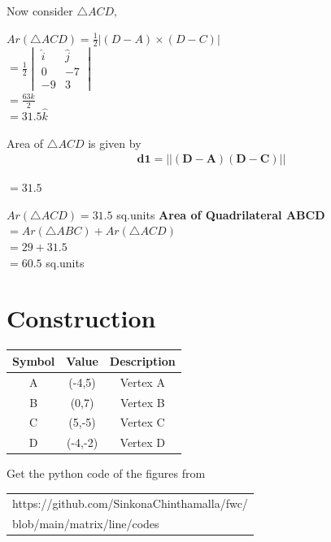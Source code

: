 \documentclass[journal,12pt,twocolumn]{IEEEtran}
\begin{document}
\vspace{0.6cm}
\raggedright 
Now consider $ \triangle ACD, $
\vspace{0.2cm}
\begin{center}
\boldmath
$ Ar(\triangle ACD)= \frac{1}{2}|(D-A)\times (D-C)| $
\unboldmath
\vspace{0.2cm}
\\ $ = \frac{1}{2} \begin{vmatrix}
                    \hat{i} & \hat{j}\\
                    0 & -7\\
                   -9 &  3
                   \end{vmatrix} $
\vspace{0.4cm}
\\$ = \frac{63\hat{k}}{2}   $
\vspace{0.2cm}
\\$ = 31.5\hat{k}  $
\end{center}
\vspace{0.2cm}
\raggedright 
Area of 
$\triangle ACD$ is given by
\begin{eqnarray}
\boldsymbol{d1} = ||\boldsymbol{(D-A)}\boldsymbol{(D-C)}||
\end{eqnarray}
\begin{center}
$ = 31.5 $
\end{center}
\vspace{0.2cm}
\raggedright
$ Ar(\triangle ACD)= 31.5 $ sq.units
\boldmath
\textbf{Area of Quadrilateral ABCD} 
$= Ar(\triangle ABC)+Ar(\triangle ACD) $
\unboldmath
\vspace{0.2cm}
\\$ = 29+31.5 $
\vspace{0.2cm}
\\$ = 60.5 $ sq.units

\vspace{0.2cm}
\section*{Construction}
\centering
\vspace{0.2cm}
{
\setlength\extrarowheight{2pt}
\begin{tabular}{|c|c|c|}
	\hline
	\textbf{Symbol}&\textbf{Value}&\textbf{Description}\\
	\hline
	A & (-4,5) & Vertex A\\
	\hline
	B & (0,7) & Vertex B\\
	\hline
	C & (5,-5) & Vertex C\\
	\hline
	D & (-4,-2) & Vertex D\\
	\hline
\end{tabular}
}

\vspace{0.6cm}
Get the python code of the figures from
\begin{table}[h]
\large
\centering
\begin{tabular}{|l|}
\hline
https://github.com/SinkonaChinthamalla/fwc/
\\blob/main/matrix/line/codes \\
\hline
\end{tabular}

\end{table}
\end{document}
